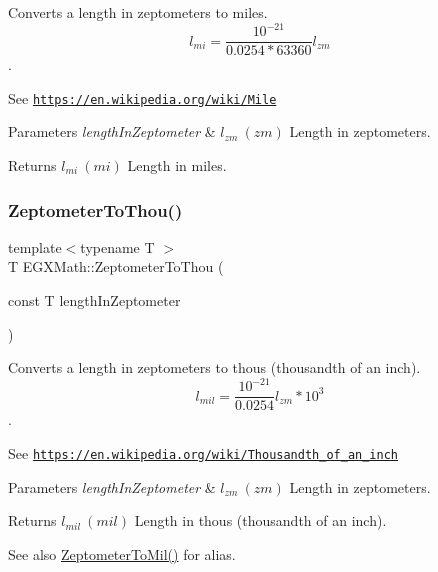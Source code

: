 Converts a length in zeptometers to miles. \[ l_{mi}=\frac{10^{-21}}{0.0254 * 63360} l_{zm} \]. 

See \href{https://en.wikipedia.org/wiki/Mile}{\tt https\+://en.\+wikipedia.\+org/wiki/\+Mile} 
\begin{DoxyParams}{Parameters}
{\em length\+In\+Zeptometer} & $ l_{zm}\ (zm)$ Length in zeptometers. \\
\hline
\end{DoxyParams}
\begin{DoxyReturn}{Returns}
$ l_{mi}\ (mi)$ Length in miles. 
\end{DoxyReturn}
\mbox{\label{group___e_g_x_math-_conversions-_length_conversions-_zeptometer-_imperial_ga14432ed712e073dcae040496f83464b6}} 
\subsubsection{\texorpdfstring{Zeptometer\+To\+Thou()}{ZeptometerToThou()}}
{\footnotesize\ttfamily template$<$typename T $>$ \\
T E\+G\+X\+Math\+::\+Zeptometer\+To\+Thou (\begin{DoxyParamCaption}\item[{const T}]{length\+In\+Zeptometer }\end{DoxyParamCaption})}



Converts a length in zeptometers to thous (thousandth of an inch). \[ l_{mil}= \frac{10^{-21}}{0.0254} l_{zm} * 10^{3} \]. 

See \href{https://en.wikipedia.org/wiki/Thousandth_of_an_inch}{\tt https\+://en.\+wikipedia.\+org/wiki/\+Thousandth\+\_\+of\+\_\+an\+\_\+inch} 
\begin{DoxyParams}{Parameters}
{\em length\+In\+Zeptometer} & $ l_{zm}\ (zm)$ Length in zeptometers. \\
\hline
\end{DoxyParams}
\begin{DoxyReturn}{Returns}
$ l_{mil}\ (mil)$ Length in thous (thousandth of an inch). 
\end{DoxyReturn}
\begin{DoxySeeAlso}{See also}
\mbox{\hyperlink{group___e_g_x_math-_conversions-_length_conversions-_zeptometer-_imperial_ga68abfac4247069bdffc24002b0636495}{Zeptometer\+To\+Mil()}} for alias. 
\end{DoxySeeAlso}
\mbox{\label{group___e_g_x_math-_conversions-_length_conversions-_zeptometer-_imperial_ga91e05169db4f6ae477da7428ff5a42b8}} 
